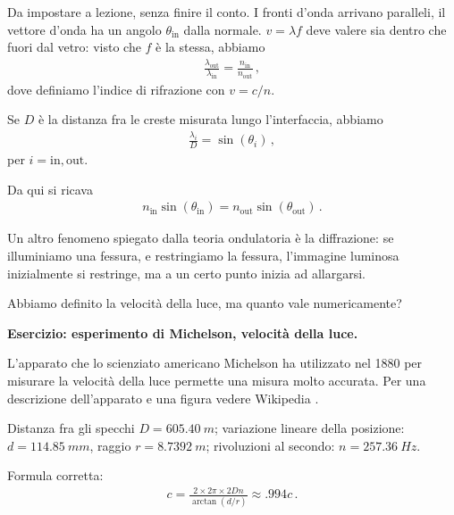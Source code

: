 \documentclass{article}
\begin{document}
Da impostare a lezione, senza finire il conto. 
I fronti d'onda arrivano paralleli, il vettore d'onda ha un angolo \(\theta _{\text{in}}\) dalla normale. \(v = \lambda f\) deve valere sia dentro che fuori dal vetro: visto che \(f\) è la stessa, abbiamo 
%
\begin{align}
\frac{ \lambda _{\text{out}}}{\lambda _{\text{in}}} = \frac{n _{\text{in}}}{n _{\text{out}}}
\,,
\end{align}
%
dove definiamo l'indice di rifrazione con \(v = c/n\). 

Se \(D\) è la distanza fra le creste misurata lungo l'interfaccia, abbiamo 
%
\begin{align}
\frac{\lambda_{i}}{D} = \sin(\theta_{i})
\,,
\end{align}
%
per \(i = \text{in}, \text{out}\). 

Da qui si ricava 
%
\begin{align}
n _{\text{in}} \sin(\theta _{\text{in}}) = 
n _{\text{out}} \sin(\theta _{\text{out}})
\,.
\end{align}

Un altro fenomeno spiegato dalla teoria ondulatoria è la diffrazione: se illuminiamo una fessura, e restringiamo la fessura, l'immagine luminosa inizialmente si restringe, ma a un certo punto inizia ad allargarsi.

Abbiamo definito la velocità della luce, ma quanto vale numericamente? 

\textbf{Esercizio: esperimento di Michelson, velocità della luce.}


L'apparato che lo scienziato americano Michelson ha utilizzato nel 1880 \cite[]{michelsonExperimentalDeterminationVelocity1880} per misurare la velocità della luce permette una misura molto accurata.
Per una descrizione dell'apparato e una figura vedere Wikipedia \cite[]{FizeauFoucaultApparatus2019}.

Distanza fra gli specchi \(D = \SI{605.40}{m}\); variazione lineare della posizione: \(d = \SI{114.85}{mm}\), raggio \(r = \SI{8.7392}{m}\); rivoluzioni al secondo: \(n = \SI{257.36}{Hz}\).

Formula corretta: 
%
\begin{align}
c = \frac{2 \times 2 \pi \times 2 D n}{\arctan(d / r)} \approx \num{.994} c
\,.
\end{align}
\end{document}
